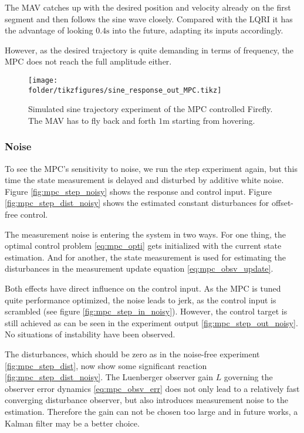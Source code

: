 The MAV catches up with the desired position and velocity already on the first segment and then follows the sine wave closely. Compared with the LQRI it has the advantage of looking $0.4\si{\second}$ into the future, adapting its inputs accordingly. 

However, as the desired trajectory is quite demanding in terms of frequency, the MPC does not reach the full amplitude either. 

\begin{figure}
\centering
\texttt{[image: \\folder/tikzfigures/sine\_response\_out\_MPC.tikz]}
\caption{Simulated sine trajectory experiment  of the MPC controlled Firefly. The MAV has to fly back and forth $1\si{\metre}$ starting from hovering.}
\label{fig:mpc_sine}
\end{figure} 

\subsubsection{Noise}
To see the MPC's sensitivity to noise, we run the step experiment again, but this time the state measurement is delayed and disturbed by additive white noise. Figure \ref{fig:mpc_step_noisy} shows the response and control input. Figure \ref{fig:mpc_step_dist_noisy} shows the estimated constant disturbances for offset-free control.

The measurement noise is entering the system in two ways. For one thing, the optimal control problem \ref{eq:mpc_opti} gets initialized with the current state estimation. And for another, the state measurement is used for estimating the disturbances in the measurement update equation \ref{eq:mpc_obsv_update}.

Both effects have direct influence on the control input. As the MPC is tuned quite performance optimized, the noise leads to jerk, as the control input is scrambled (see figure \ref{fig:mpc_step_in_noisy}). However, the control target is still achieved as can be seen in the experiment output \ref{fig:mpc_step_out_noisy}. No situations of instability have been observed.


The disturbances, which should be zero as in the noise-free experiment \ref{fig:mpc_step_dist}, now show some significant reaction \ref{fig:mpc_step_dist_noisy}. The Luenberger observer gain $L$ governing the observer error dynamics \ref{eq:mpc_obsv_err} does not only lead to a relatively fast converging disturbance observer, but also introduces measurement noise to the estimation. Therefore the gain can not be chosen too large and in future works, a Kalman filter may be a better choice.

